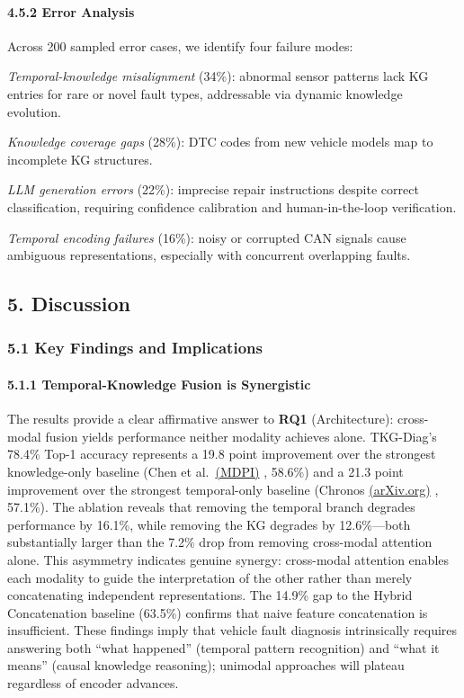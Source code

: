 \documentclass[
  11pt,
]{article}
\begin{document}
\paragraph{4.5.2 Error Analysis}\label{error-analysis}

Across 200 sampled error cases, we identify four failure modes:

\emph{Temporal-knowledge misalignment} (34\%): abnormal sensor patterns
lack KG entries for rare or novel fault types, addressable via dynamic
knowledge evolution.

\emph{Knowledge coverage gaps} (28\%): DTC codes from new vehicle models
map to incomplete KG structures.

\emph{LLM generation errors} (22\%): imprecise repair instructions
despite correct classification, requiring confidence calibration and
human-in-the-loop verification.

\emph{Temporal encoding failures} (16\%): noisy or corrupted CAN signals
cause ambiguous representations, especially with concurrent overlapping
faults.

\newpage

\subsection{5. Discussion}\label{discussion}

\subsubsection{5.1 Key Findings and
Implications}\label{key-findings-and-implications}

\paragraph{5.1.1 Temporal-Knowledge Fusion is
Synergistic}\label{temporal-knowledge-fusion-is-synergistic}

The results provide a clear affirmative answer to \textbf{RQ1}
(Architecture): cross-modal fusion yields performance neither modality
achieves alone. TKG-Diag's 78.4\% Top-1 accuracy represents a 19.8 point
improvement over the strongest knowledge-only baseline (Chen et
al.~\href{https://www.mdpi.com/2079-9292/14/21/4180}{(MDPI)} , 58.6\%)
and a 21.3 point improvement over the strongest temporal-only baseline
(Chronos \href{https://arxiv.org/abs/2403.07815}{(arXiv.org)} , 57.1\%).
The ablation reveals that removing the temporal branch degrades
performance by 16.1\%, while removing the KG degrades by 12.6\%---both
substantially larger than the 7.2\% drop from removing cross-modal
attention alone. This asymmetry indicates genuine synergy: cross-modal
attention enables each modality to guide the interpretation of the other
rather than merely concatenating independent representations. The 14.9\%
gap to the Hybrid Concatenation baseline (63.5\%) confirms that naive
feature concatenation is insufficient. These findings imply that vehicle
fault diagnosis intrinsically requires answering both ``what happened''
(temporal pattern recognition) and ``what it means'' (causal knowledge
reasoning); unimodal approaches will plateau regardless of encoder
advances.
\end{document}
